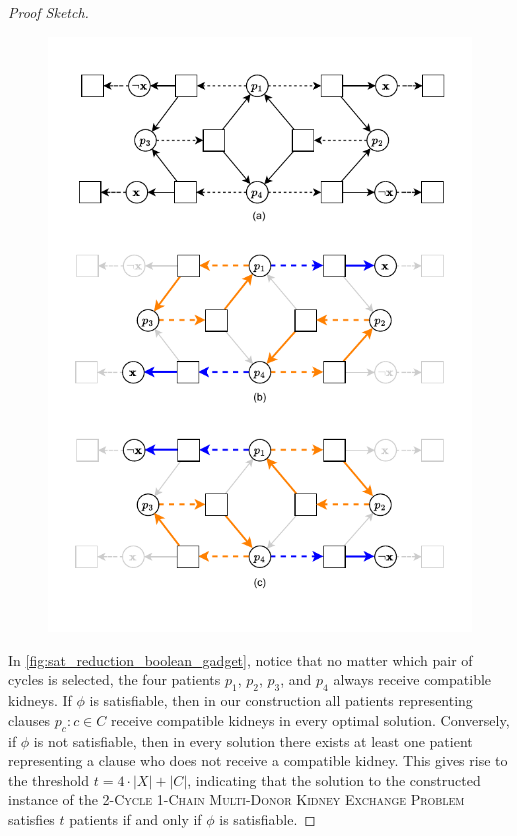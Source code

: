 \begin{proof}[Proof Sketch]
\begin{figure}
    \centering
    \includegraphics{data/sat_reduction_boolean_gadget.pdf}
    \caption[]{}
    \label{fig:sat_reduction_boolean_gadget}
\end{figure}

In \autoref{fig:sat_reduction_boolean_gadget}, notice that no matter which pair of cycles is selected, the four patients $p_1$, $p_2$, $p_3$, and $p_4$ always receive compatible kidneys. If $\phi$ is satisfiable, then in our construction all patients representing clauses ${ p_c : c \in C }$ receive compatible kidneys in every optimal solution. Conversely, if $\phi$ is not satisfiable, then in every solution there exists at least one patient representing a clause who does not receive a compatible kidney. This gives rise to the threshold $t = 4 \cdot |X| + |C|$, indicating that the solution to the constructed instance of the \textsc{2-Cycle 1-Chain Multi-Donor Kidney Exchange Problem} satisfies $t$ patients if and only if $\phi$ is satisfiable.
\end{proof}




